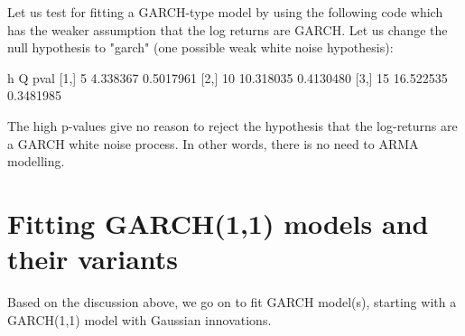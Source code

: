 \documentclass[article,nojss]{jss}
\begin{document}
Let us test for fitting a GARCH-type model by using the following code which has the
weaker assumption that the log returns are GARCH.
Let us change the null hypothesis to "garch" (one possible weak white noise hypothesis):
\begin{Schunk}
\begin{Soutput}
      h         Q      pval
[1,]  5  4.338367 0.5017961
[2,] 10 10.318035 0.4130480
[3,] 15 16.522535 0.3481985
\end{Soutput}
\end{Schunk}

The high p-values give no reason to reject the hypothesis
that the log-returns are a GARCH white noise process. In other words, there is no need to
ARMA modelling.



\section{Fitting GARCH(1,1) models and their variants}
\label{sec:fit garch}

Based on the discussion above, we go on to fit GARCH model(s), starting with a GARCH(1,1)
model with Gaussian innovations.
\end{document}
